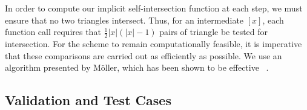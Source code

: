 In order to compute our implicit self-intersection function at each step, we must ensure that no two triangles intersect. Thus, for an intermediate $[x]$, each function call requires that $\frac{1}{2}|x|(|x| - 1)$ pairs of triangle be tested for intersection. For the scheme to remain computationally feasible, it is imperative that these comparisons are carried out as efficiently as possible. We use an algorithm presented by M\"oller, which has been shown to be effective ~\cite{Möller97afast}.


\subsection{Validation and Test Cases}

